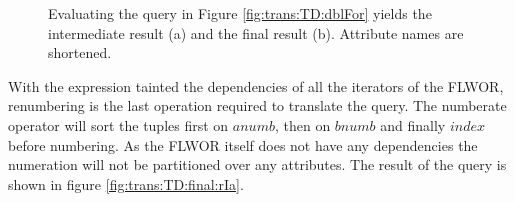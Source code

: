 \begin{myExample}
\begin{figure}[h]
\centering
{}
\qquad
{}
\caption[Example: resolving simple FLWOR]{Evaluating the query in Figure \ref{fig:trans:TD:dblFor} yields the
intermediate result (a) and the final result (b). Attribute names are
shortened. \label{fig:trans:TD:finaliseExp}}
\end{figure}

With the expression tainted the dependencies of all the iterators of the FLWOR, renumbering is the last operation
required to translate the query. The \textsf{numberate} operator will sort the tuples first on $anumb$, then on
$bnumb$ and finally $index$ before numbering. As the FLWOR itself does not have any dependencies the numeration
will not be partitioned over any attributes. The result of the query is shown in figure
\ref{fig:trans:TD:final:rIa}.
\end{myExample}

